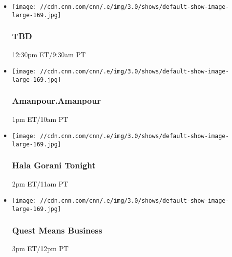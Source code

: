 \begin{itemize}
\item
  \texttt{[image: //cdn.cnn.com/cnn/.e/img/3.0/shows/default-show-image-large-169.jpg]}

  \hypertarget{tbd-7}{%
  \subsubsection{TBD}\label{tbd-7}}

  12:30pm ET/9:30am PT
\end{itemize}

\begin{itemize}
\item
  \texttt{[image: //cdn.cnn.com/cnn/.e/img/3.0/shows/default-show-image-large-169.jpg]}

  \hypertarget{amanpouramanpour--9}{%
  \subsubsection{Amanpour.Amanpour }\label{amanpouramanpour--9}}

  1pm ET/10am PT
\end{itemize}

\begin{itemize}
\item
  \texttt{[image: //cdn.cnn.com/cnn/.e/img/3.0/shows/default-show-image-large-169.jpg]}

  \hypertarget{hala-gorani-tonight-3}{%
  \subsubsection{Hala Gorani Tonight}\label{hala-gorani-tonight-3}}

  2pm ET/11am PT
\end{itemize}

\begin{itemize}
\item
  \texttt{[image: //cdn.cnn.com/cnn/.e/img/3.0/shows/default-show-image-large-169.jpg]}

  \hypertarget{quest-means-business-3}{%
  \subsubsection{Quest Means Business}\label{quest-means-business-3}}

  3pm ET/12pm PT
\end{itemize}


